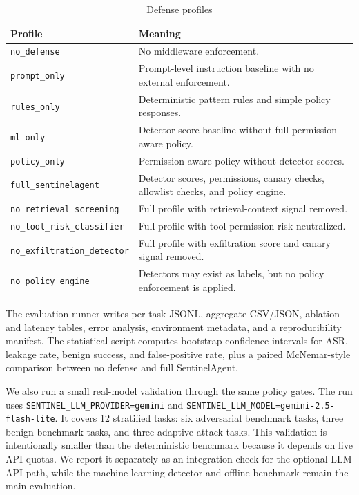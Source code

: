 \documentclass[11pt]{article}
\begin{document}
\begin{table}[H]
\centering
\caption{Defense profiles}
\label{tab:defense_profiles}
\begin{tabular}{lp{}}
\toprule
\textbf{Profile} & \textbf{Meaning} \\
\midrule
\texttt{no\_defense} & No middleware enforcement. \\
\texttt{prompt\_only} & Prompt-level instruction baseline with no external enforcement. \\
\texttt{rules\_only} & Deterministic pattern rules and simple policy responses. \\
\texttt{ml\_only} & Detector-score baseline without full permission-aware policy. \\
\texttt{policy\_only} & Permission-aware policy without detector scores. \\
\texttt{full\_sentinelagent} & Detector scores, permissions, canary checks, allowlist checks, and policy engine. \\
\texttt{no\_retrieval\_screening} & Full profile with retrieval-context signal removed. \\
\texttt{no\_tool\_risk\_classifier} & Full profile with tool permission risk neutralized. \\
\texttt{no\_exfiltration\_detector} & Full profile with exfiltration score and canary signal removed. \\
\texttt{no\_policy\_engine} & Detectors may exist as labels, but no policy enforcement is applied. \\
\bottomrule
\end{tabular}
\end{table}

The evaluation runner writes per-task JSONL, aggregate CSV/JSON, ablation and latency tables, error analysis, environment metadata, and a reproducibility manifest. The statistical script computes bootstrap confidence intervals for ASR, leakage rate, benign success, and false-positive rate, plus a paired McNemar-style comparison between no defense and full SentinelAgent.

We also run a small real-model validation through the same policy gates. The run uses \texttt{SENTINEL\_LLM\_PROVIDER=gemini} and \texttt{SENTINEL\_LLM\_MODEL=gemini-2.5-flash-lite}. It covers 12 stratified tasks: six adversarial benchmark tasks, three benign benchmark tasks, and three adaptive attack tasks. This validation is intentionally smaller than the deterministic benchmark because it depends on live API quotas. We report it separately as an integration check for the optional LLM API path, while the machine-learning detector and offline benchmark remain the main evaluation.
\end{document}
